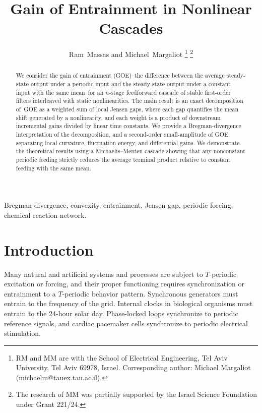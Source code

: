 \documentclass[onecolumn]{IEEEtran}
\title{Gain of Entrainment in Nonlinear Cascades }
\author{Ram~Massas and Michael~Margaliot%
\thanks{RM and MM are with the School of Electrical Engineering,
Tel Aviv University, Tel Aviv 69978, Israel.
Corresponding author: Michael Margaliot (michaelm@tauex.tau.ac.il).}%
\thanks{The research of MM  was partially supported by the Israel Science
Foundation under Grant 221/24.}}
\begin{document}
\maketitle



\begin{abstract}
We consider the gain of entrainment (GOE)--the difference between the average steady-state output under a periodic input and the steady-state output under a constant input with the same mean--for an $n$-stage feedforward cascade of stable first-order filters interleaved with static nonlinearities. The main result is an exact decomposition of~GOE as a weighted sum of local Jensen gaps, where each gap quantifies the mean shift generated by a  nonlinearity, and each weight is a product of downstream incremental  gains divided by linear time constants. We provide a Bregman-divergence interpretation of the decomposition, and a  second-order small-amplitude of GOE separating local curvature, fluctuation energy, and differential gains.
We demonstrate the theoretical results using a Michaelis–Menten cascade showing that any nonconstant periodic feeding strictly reduces the average terminal product relative to constant feeding with the same mean.
\end{abstract}

\begin{IEEEkeywords}
Bregman divergence, convexity, entrainment, Jensen gap,
 periodic forcing, chemical reaction network.
\end{IEEEkeywords}

\section{Introduction}
\label{sec:introduction}

Many natural and artificial systems and processes are subject to $T$-periodic excitation or forcing, and 
their proper functioning requires synchronization or entrainment to a $T$-periodic  behavior pattern. Synchronous generators must entrain to the frequency of the grid. Internal clocks in biological organisms must entrain to the 24-hour solar day.  
Phase-locked loops synchronize to periodic reference signals, and
cardiac pacemaker cells synchronize to periodic electrical stimulation. 
\end{document}
